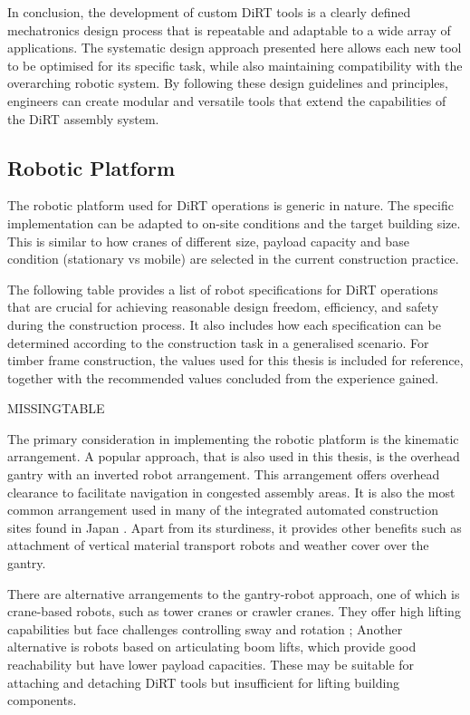 In conclusion, the development of custom DiRT tools is a clearly defined mechatronics design process that is repeatable and adaptable to a wide array of applications. The systematic design approach presented here allows each new tool to be optimised for its specific task, while also maintaining compatibility with the overarching robotic system. By following these design guidelines and principles, engineers can create modular and versatile tools that extend the capabilities of the DiRT assembly system. 

\subsection{Robotic Platform}
\label{subsection:discussion_robotic_platform}

The robotic platform used for DiRT operations is generic in nature. The specific implementation can be adapted to on-site conditions and the target building size. This is similar to how cranes of different size, payload capacity and base condition (stationary vs mobile) are selected in the current construction practice. 

The following table provides a list of robot specifications for DiRT operations that are crucial for achieving reasonable design freedom, efficiency, and safety during the construction process. It also includes how each specification can be determined according to the construction task in a generalised scenario. For timber frame construction, the values used for this thesis is included for reference, together with the recommended values concluded from the experience gained.

MISSINGTABLE

The primary consideration in implementing the robotic platform is the kinematic arrangement. A popular approach, that is also used in this thesis, is the overhead gantry with an inverted robot arrangement. This arrangement offers overhead clearance to facilitate navigation in congested assembly areas. It is also the most common arrangement used in many of the integrated automated construction sites found in Japan \parencite{linnerAutomatedRoboticConstruction2013, potterJapanSkyscraperFactories2022}. Apart from its sturdiness, it provides other benefits such as attachment of vertical material transport robots and weather cover over the gantry.

There are alternative arrangements to the gantry-robot approach, one of which is crane-based robots, such as tower cranes or crawler cranes. They offer high lifting capabilities but face challenges controlling sway \parencite{neupertTrackingAntiswayControl2010} and rotation \parencite{liangRASRoboticAssembly2017}; Another alternative is robots based on articulating boom lifts, which provide good reachability but have lower payload capacities. These may be suitable for attaching and detaching DiRT tools but insufficient for lifting building components. 

